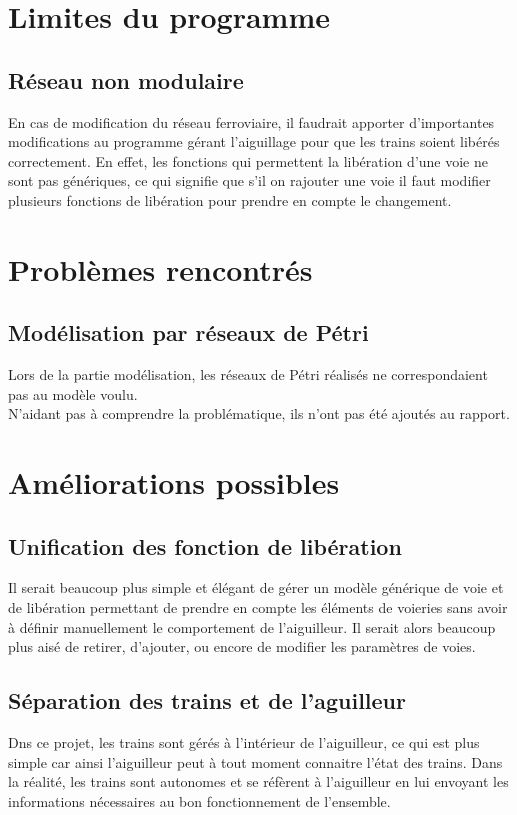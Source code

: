 \documentclass[a4paper, 12pt]{report}
\begin{document}
\section{Limites du programme}
\subsection{Réseau non modulaire}
En cas de modification du réseau ferroviaire, 
il faudrait apporter d'importantes modifications au programme gérant l'aiguillage pour que les trains soient libérés correctement. 
En effet, les fonctions qui permettent la libération d'une voie ne sont pas génériques, 
ce qui signifie que s'il on rajouter une voie il faut modifier plusieurs fonctions de libération pour prendre en compte le changement. 

\section{Problèmes rencontrés}
\subsection{Modélisation par réseaux de Pétri}
Lors de la partie modélisation, les réseaux de Pétri réalisés ne correspondaient pas au modèle voulu.\\
N'aidant pas à comprendre la problématique, ils n'ont pas été ajoutés au rapport. 

\section{Améliorations possibles}
\subsection{Unification des fonction de libération}
Il serait beaucoup plus simple et élégant de gérer un modèle générique de voie et 
de libération permettant de prendre en compte les éléments de voieries sans avoir à définir manuellement le comportement de l'aiguilleur. 
Il serait alors beaucoup plus aisé de retirer, d'ajouter, ou encore de modifier les paramètres de voies. 

\subsection{Séparation des trains et de l'aguilleur}
Dns ce projet, les trains sont gérés à l'intérieur de l'aiguilleur, ce qui est plus simple car ainsi 
l'aiguilleur peut à tout moment connaitre l'état des trains.
Dans la réalité, les trains sont autonomes et se réfèrent à l'aiguilleur 
en lui envoyant les informations nécessaires au bon fonctionnement de l'ensemble.
\end{document}
